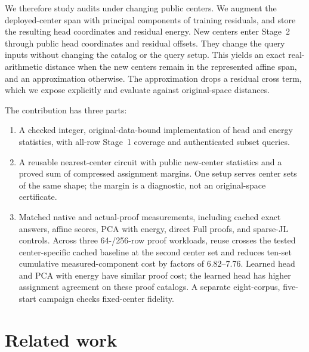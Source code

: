 \documentclass[5p,times,twocolumn]{elsarticle}
\theoremstyle{plain}
\theoremstyle{definition}
\theoremstyle{remark}
\begin{document}
\par\endgroup
\begingroup\color{RevisionGreen}
We therefore study audits under changing public centers. We augment the deployed-center span with principal components of training residuals, and store the resulting head coordinates and residual energy. New centers enter Stage~2 through public head coordinates and residual offsets. They change the query inputs without changing the catalog or the query setup. This yields an exact real-arithmetic distance when the new centers remain in the represented affine span, and an approximation otherwise. The approximation drops a residual cross term, which we expose explicitly and evaluate against original-space distances.


\par\endgroup
\begingroup\color{RevisionRed}
The contribution has three parts:
\begin{enumerate}[leftmargin=*]
\item A checked integer, original-data-bound implementation of head and energy statistics, with all-row Stage~1 coverage and authenticated subset queries.
\item A reusable nearest-center circuit with public new-center statistics and a proved sum of compressed assignment margins. One setup serves center sets of the same shape; the margin is a diagnostic, not an original-space certificate.
\item Matched native and actual-proof measurements, including cached exact answers, affine scores, PCA with energy, direct Full proofs, and sparse-JL controls. Across three 64-/256-row proof workloads, reuse crosses the tested center-specific cached baseline at the second center set and reduces ten-set cumulative measured-component cost by factors of 6.82--7.76. Learned head and PCA with energy have similar proof cost; the learned head has higher assignment agreement on these proof catalogs. A separate eight-corpus, five-start campaign checks fixed-center fidelity.
\end{enumerate}


\par\endgroup
\section{Related work}\label{sec:related}
\end{document}
